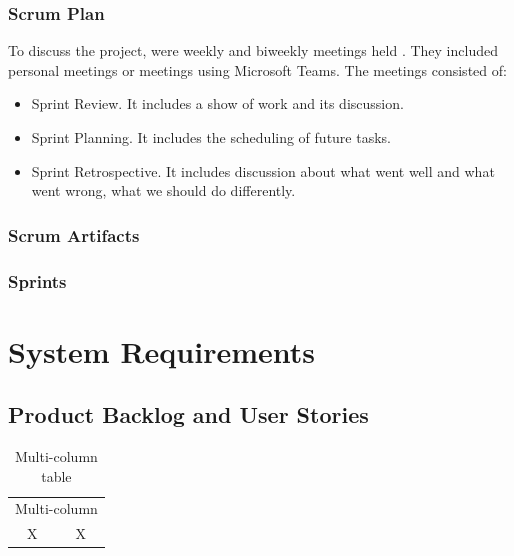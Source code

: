 \documentclass{scrartcl}
\begin{document}
  	    \subsubsection{Scrum Plan}
  	    To discuss the project, were weekly and biweekly meetings held . They included personal meetings or meetings using Microsoft Teams. The meetings consisted of:
  	    \begin{itemize}
  	    \item Sprint Review. It includes a show of work and its discussion.
  	    \item Sprint Planning. It includes the scheduling of future tasks.
  	    \item Sprint Retrospective. It includes discussion about what went well and what went wrong, what we should do differently. 
  	    \end{itemize}
  		\subsubsection{Scrum Artifacts }
  		
  		\subsubsection{Sprints}
\section{System Requirements}


\subsection{Product Backlog and User Stories}

\begin{table}[ht]
\caption{Multi-column table}
\begin{center}
\begin{tabular}{cc}
    \hline
    \multicolumn{2}{c}{Multi-column}\\
    X&X\\
    \hline
\end{tabular}
\end{center}
\label{tab:multicol}
\end{table}
\end{document}
